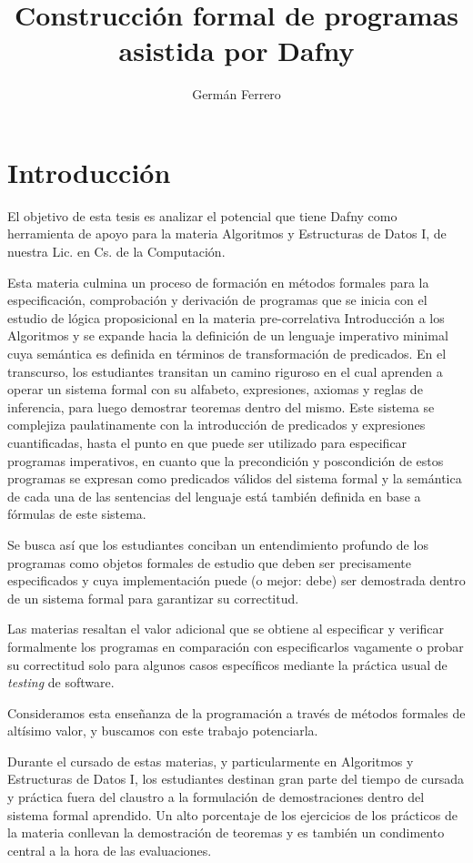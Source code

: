 \documentclass[12pt, a4paper, openany, fleqn]{book}
\author{Germán Ferrero}
\title{Construcción formal de programas asistida por Dafny}
\begin{document}
    \chapter{Introducción}
    El objetivo de esta tesis es analizar el potencial que tiene Dafny como herramienta de apoyo para la materia Algoritmos y Estructuras de Datos I, de nuestra Lic. en Cs. de la Computación.

    Esta materia culmina un proceso de formación en métodos formales para la especificación, comprobación y derivación de programas que se inicia con el estudio de lógica proposicional en la materia pre-correlativa Introducción a los Algoritmos y se expande hacia la definición de un lenguaje imperativo minimal cuya semántica es definida en términos de transformación de predicados.
    En el transcurso, los estudiantes transitan un camino riguroso en el cual aprenden a operar un sistema formal con su alfabeto, expresiones, axiomas y reglas de inferencia, para luego demostrar teoremas dentro del mismo. Este sistema se complejiza paulatinamente con la introducción de predicados y expresiones cuantificadas, hasta el punto en que puede ser utilizado para especificar programas imperativos, en cuanto que la precondición y poscondición de estos programas se expresan como predicados válidos del sistema formal y la semántica de cada una de las sentencias del lenguaje está también definida en base a fórmulas de este sistema.

    Se busca así que los estudiantes conciban un entendimiento profundo de los programas como objetos formales de estudio que deben ser precisamente especificados y cuya implementación puede (o mejor: debe) ser demostrada dentro de un sistema formal para garantizar su correctitud.

    Las materias resaltan el valor adicional que se obtiene al especificar y verificar formalmente los programas en comparación con especificarlos vagamente o probar su correctitud solo para algunos casos específicos mediante la práctica usual de \textit{testing} de software.

    Consideramos esta enseñanza de la programación a través de métodos formales de altísimo valor, y buscamos con este trabajo potenciarla.

    Durante el cursado de estas materias, y particularmente en Algoritmos y Estructuras de Datos I, los estudiantes destinan gran parte del tiempo de cursada y práctica fuera del claustro a la formulación de demostraciones dentro del sistema formal aprendido. Un alto porcentaje de los ejercicios de los prácticos de la materia conllevan la demostración de teoremas y es también un condimento central a la hora de las evaluaciones.
\end{document}

